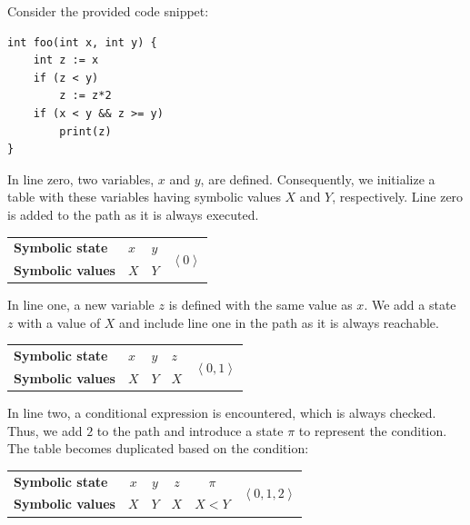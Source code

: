 \begin{example}
    Consider the provided code snippet:
    \begin{lstlisting}[style=Java]
int foo(int x, int y) {
    int z := x
    if (z < y)
        z := z*2
    if (x < y && z >= y)
        print(z) 
}
    \end{lstlisting}
    In line zero, two variables, $x$ and $y$, are defined. 
    Consequently, we initialize a table with these variables having symbolic values $X$ and $Y$, respectively. 
    Line zero is added to the path as it is always executed.
    \begin{table}[H]
        \centering
        \begin{tabular}{l|lll}
        \textbf{Symbolic state}  & $x$ & $y$ &  \multirow{2}{*}{$\left\langle 0\right\rangle $} \\ \cline{1-3}
        \textbf{Symbolic values} & $X$ & $Y$ &                      
        \end{tabular}
    \end{table}
    In line one, a new variable $z$ is defined with the same value as $x$.
    We add a state $z$ with a value of $X$ and include line one in the path as it is always reachable.
    \begin{table}[H]
        \centering
        \begin{tabular}{l|llll}
        \textbf{Symbolic state}  & $x$ & $y$ & $z$ & \multirow{2}{*}{$\left\langle 0,1 \right\rangle $} \\ \cline{1-4}
        \textbf{Symbolic values} & $X$ & $Y$ & $X$ &                     
        \end{tabular}
    \end{table}
    In line two, a conditional expression is encountered, which is always checked. 
    Thus, we add $2$ to the path and introduce a state $\pi$ to represent the condition. 
    The table becomes duplicated based on the condition:
    \begin{table}[H]
        \centering
        \begin{tabular}{l|ccccc}
        \textbf{Symbolic state}  & $x$ & $y$ & $z$ & $\pi$ & \multirow{2}{*}{$\left\langle 0,1,2 \right\rangle $} \\ \cline{1-5}
        \textbf{Symbolic values} & $X$ & $Y$ & $X$ & $X<Y$ &                    
        \end{tabular}
    \end{table}
    \begin{table}[H]
        \centering
        \begin{tabular}{l|ccccc}

\end{tabular}
\end{table}
\end{example}
